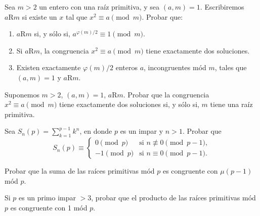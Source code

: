 \documentclass[12pt,a4paper]{book}
\begin{document}
    \begin{ejercicio}
        Sea $m>2$ un entero con una raíz primitiva, y sea $(a,m)=1$. Escribiremos $a\mathrm{R}m$
        si existe un $x$ tal que $x^{2}\equiv a\pmod{m}$. Probar que:
        \begin{enumerate}
            \item[(a)] $a\mathrm{R}m$ si, y sólo si, $a^{\varphi(m)/2}\equiv1\pmod{m}$.
            \item[(b)] Si $a\mathrm{R}m$, la congruencia $x^{2}\equiv a\pmod{m}$ tiene
            exactamente dos soluciones.
            \item[(c)] Existen exactamente $\varphi(m)/2$ enteros $a$, incongruentes mód $m$,
            tales que $(a,m)=1$ y $a\mathrm{R}m$.
        \end{enumerate}
    \end{ejercicio}

    \begin{ejercicio}
        Suponemos $m>2$, $(a,m)=1$, $a\mathrm{R}m$. Probar que la congruencia
        $x^{2}\equiv a\pmod{m}$ tiene exactamente dos soluciones si, y sólo si, $m$ tiene una
        raíz primitiva.
    \end{ejercicio}

    \begin{ejercicio}
        Sea $S_{n}(p)=\sum_{k=1}^{p-1}k^{n}$, en donde $p$ es un impar y $n>1$. Probar que
        \begin{equation*}
            S_{n}(p)\equiv
            \begin{cases}
                0\pmod{p}&\text{si }n\not\equiv0\pmod{p-1},\\
                -1\pmod{p}&\text{si }n\equiv0\pmod{p-1}.
            \end{cases}
        \end{equation*}
    \end{ejercicio}

    \begin{ejercicio}
        Probar que la suma de las raíces primitivas mód $p$ es congruente con
        $\mu(p-1)$ mód $p$.
    \end{ejercicio}

    \begin{ejercicio}
        Si $p$ es un primo impar $>3$, probar que el producto de las raíces primitivas mód
        $p$ es congruente con 1 mód $p$.
    \end{ejercicio}
\end{document}
